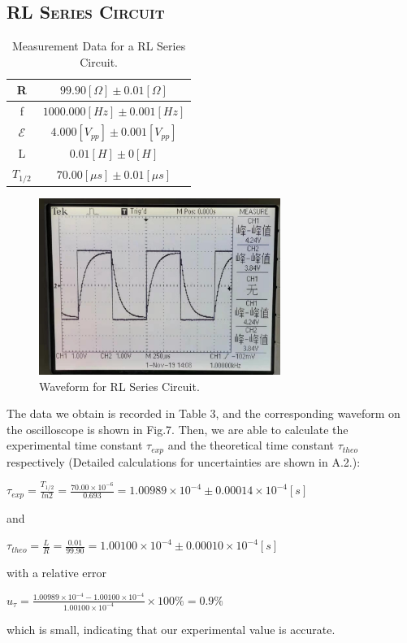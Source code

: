 \documentclass[a4paper,12pt]{article}
\begin{document}
\subsection{\textsc{RL Series Circuit}}

\begin{table}[htbb]
\begin{center}
\begin{tabular}{|c|c|}
\hline
R & $99.90 [\Omega] \pm 0.01 [\Omega]$ \\ \hline
f & $ 1000.000 [Hz] \pm 0.001 [Hz] $ \\ \hline
$\mathcal{E}$ & $ 4.000[V_{pp}] \pm 0.001[V_{pp}] $ \\ \hline
L & $ 0.01 [H] \pm 0 [H] $ \\ \hline
$T_{1/2}$ & $ 70.00[\mu s] \pm 0.01[\mu s] $ \\ \hline
\end{tabular}
\caption{Measurement Data for a RL Series Circuit.}
\end{center}
\end{table}

\begin{figure}[htb] 
    \centering
    \includegraphics[width=0.7\textwidth]{p2} 
    \caption{Waveform for RL Series Circuit.} 
\end{figure}

\newpage
The data we obtain is recorded in Table 3, and the corresponding waveform on the oscilloscope is shown in Fig.7. Then, we are able to calculate the experimental time constant $\tau_{exp}$ and the theoretical time constant $\tau_{theo}$ respectively (Detailed calculations for uncertainties are shown in A.2.):
\begin{center}
$\displaystyle \tau_{exp} = \frac{T_{1/2}}{ln2} = \frac{70.00\times 10^{-6}}{0.693} = 1.00989 \times 10^{-4} \pm 0.00014 \times 10^{-4} [s]$
\end{center}
and
\begin{center}
$\displaystyle \tau_{theo} = \frac{L}{R} = \frac{0.01}{99.90} =  1.00100 \times 10^{-4} \pm 0.00010 \times 10^{-4} [s] $
\end{center}
with a relative error 
\begin{center}
$\displaystyle u_\tau = \frac{1.00989 \times 10^{-4} - 1.00100 \times 10^{-4}}{1.00100 \times 10^{-4}} \times 100\% = 0.9\% $ 
\end{center}
which is small, indicating that our experimental value is accurate.
\end{document}
